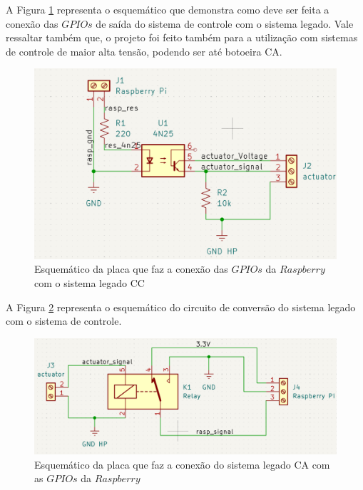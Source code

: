 \documentclass{ecatfg}
\begin{document}
A Figura \ref{fig:1} representa o esquemático que demonstra como deve ser feita a conexão das $GPIOs$ de saída do sistema de controle com o sistema legado. Vale ressaltar também que, o projeto foi feito também para a utilização com sistemas de controle de maior alta tensão, podendo ser até botoeira CA.\par

\begin{figure}[!htb]
    \centering
    \includegraphics[scale=0.2]{Figuras/rasp_actuator.png}
    \caption{Esquemático da placa que faz a conexão das $GPIOs$ da $Raspberry$ com o sistema legado CC}
    \label{fig:1}
\end{figure}

 A Figura \ref{fig:2} representa o esquemático do circuito de conversão do sistema legado com o sistema de controle. \par

\begin{figure}[!htb]
    \centering
    \includegraphics[scale=0.15]{Figuras/atuador_rasp.png}
    \caption{Esquemático da placa que faz a conexão do sistema legado CA com as $GPIOs$ da $Raspberry$}
    \label{fig:2}
\end{figure}
\end{document}
